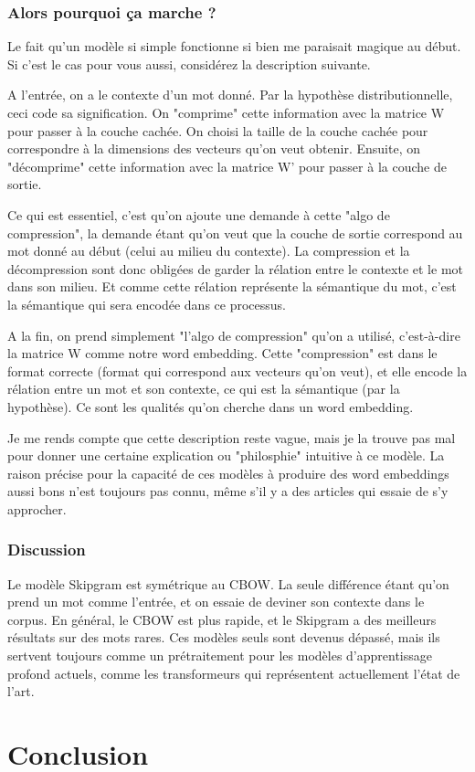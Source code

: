 \documentclass[11pt, a4paper]{report}
\begin{document}
\subsection{Alors pourquoi ça marche ?}
Le fait qu'un modèle si simple fonctionne si bien me paraisait magique au début. Si c'est le 
cas pour vous aussi, considérez la description suivante. 

A l'entrée, on a le contexte d'un mot donné. Par la hypothèse distributionnelle, ceci code 
sa signification. On "comprime" cette information avec la matrice W pour passer à la couche 
cachée. On choisi la taille de la couche cachée pour correspondre à la dimensions des vecteurs 
qu'on veut obtenir. Ensuite, on "décomprime" cette information avec la matrice W' 
pour passer à la couche de sortie. 

Ce qui est essentiel, c'est qu'on ajoute une demande  
à cette "algo de compression", la demande étant qu'on veut que la couche de sortie 
correspond au mot donné au début (celui au milieu du contexte). La compression et la 
décompression sont donc obligées de garder la rélation entre le contexte et le mot dans son 
milieu. Et comme cette rélation représente la sémantique du mot, c'est la sémantique qui sera 
encodée dans ce processus. 

A la fin, on prend simplement "l'algo de compression" qu'on a utilisé, c'est-à-dire la matrice 
W comme notre word embedding. Cette "compression" est dans le format correcte (format qui 
correspond aux vecteurs qu'on veut), et elle encode la rélation entre un mot et son contexte, 
ce qui est la sémantique (par la hypothèse). Ce sont les qualités qu'on cherche dans un word 
embedding. 

Je me rends compte que cette description reste vague, mais je la trouve pas mal pour donner une
certaine explication ou "philosphie" intuitive à ce modèle. La raison précise pour la capacité de ces 
modèles à produire des word embeddings aussi bons n'est toujours pas connu, 
même s'il y a des articles qui essaie de s'y approcher. 

\subsection{Discussion}
\cite{wikipedia-wembedding} Le modèle Skipgram est symétrique au CBOW. La seule différence étant qu'on prend un mot comme l'entrée, 
et on essaie de deviner son contexte dans le corpus. En général, le CBOW est plus rapide, et le 
Skipgram a des meilleurs résultats sur des mots rares. Ces modèles 
seuls sont devenus dépassé, mais ils sertvent toujours comme un prétraitement pour les modèles 
d'apprentissage profond actuels, comme les transformeurs qui représentent actuellement l'état 
de l'art.  

\chapter{Conclusion}



\end{document}
